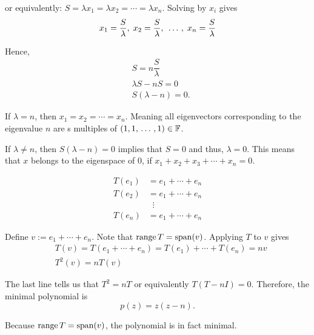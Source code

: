 \begin{xrcs}
\begin{xsol}
    or equivalently: $S = \lambda x_1 = \lambda x_2 = \cdots = \lambda x_n$. Solving by $x_i$ gives
    \begin{equation}
      x_1 = \dfrac{S}{\lambda}, \; x_2 = \dfrac{S}{\lambda}, \; {\, \ldots \,\,}, \; x_n = \dfrac{S}{\lambda}
    \end{equation}

    Hence,
    \begin{equation}
      \begin{aligned}
        &S=n \dfrac{S}{\lambda}\\
        &\lambda S - nS = 0 \\
        &S ( \lambda - n) = 0.
      \end{aligned}
    \end{equation}

    If $\lambda = n$, then $x_1 = x_2 = \cdots = x_n$. Meaning all eigenvectors corresponding to the eigenvalue $n$ are s multiples of $(1, 1, {\, \ldots \,\,} ,1 ) \in \mathbb{F}$.

    If $\lambda \neq n$, then $S ( \lambda - n) = 0$ implies that $S=0$ and thus, $\lambda = 0$. This means that $x$ belongs to the eigenspace of $0$, if $x_1 + x_2 + x_3 + \cdots + x_n = 0$.

    \begin{equation}
      \begin{aligned}
        T(e_1) &= e_1 + \cdots + e_n \\
        T(e_2) &= e_1 + \cdots + e_n \\
               & \; \; \vdots \\
        T(e_n) &= e_1 + \cdots + e_n
      \end{aligned}
    \end{equation}

    Define $v := e_1 + \cdots + e_n$. Note that $\operatorname{range} T = \operatorname{span} (v)$. Applying $T$ to $v$ gives
    \begin{equation}
      \begin{aligned}
        &T(v) = T(e_1 + \cdots + e_n) = T(e_1) + \cdots + T(e_n) = n v \\
        &T^2(v) = n T(v) %
      \end{aligned}
    \end{equation}

    The last line tells us that $T^2 = nT$ or equivalently $T(T-nI) = 0$. Therefore, the minimal polynomial is
    \begin{equation}
      p(z) = z(z-n).
    \end{equation}

    Because $\operatorname{range} T = \operatorname{span} (v)$, the polynomial is in fact minimal.
  \end{xsol}
\end{xrcs}